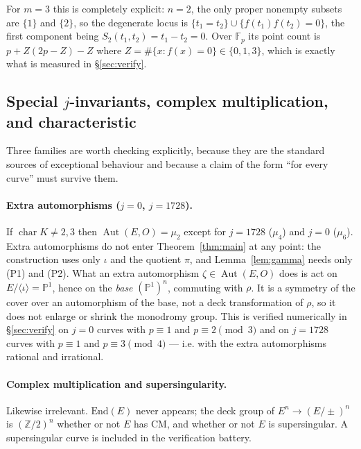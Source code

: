 \documentclass[11pt,a4paper]{article}
\theoremstyle{plain}
\theoremstyle{definition}
\DeclareMathOperator{\Aut}{Aut}
\newcommand{\PP}{\mathbb{P}}
\newcommand{\FF}{\mathbb{F}}
\newcommand{\ZZ}{\mathbb{Z}}
\begin{document}
For $m = 3$ this is completely explicit: $n = 2$, the only proper nonempty
subsets are $\{1\}$ and $\{2\}$, so the degenerate locus is
$\{t_1 = t_2\} \cup \{ f(t_1)f(t_2) = 0 \}$, the first component being
$S_2(t_1,t_2) = t_1 - t_2 = 0$. Over $\FF_p$ its point count is
$p + Z(2p - Z) - Z$ where $Z = \#\{ x : f(x) = 0\} \in \{0,1,3\}$, which is
exactly what is measured in \S\ref{sec:verify}.

\subsection{Special $j$-invariants, complex multiplication, and characteristic}
\label{sec:special}

Three families are worth checking explicitly, because they are the standard
sources of exceptional behaviour and because a claim of the form ``for every
curve'' must survive them.

\paragraph{Extra automorphisms ($j = 0$, $j = 1728$).}
If $\operatorname{char} K \neq 2,3$ then $\Aut(E,O) = \mu_2$ except for
$j = 1728$ ($\mu_4$) and $j = 0$ ($\mu_6$). Extra automorphisms do not enter
Theorem~\ref{thm:main} at any point: the construction uses only $\iota$ and the
quotient $\pi$, and Lemma~\ref{lem:gamma} needs only (P1) and (P2). What an extra
automorphism $\zeta \in \Aut(E,O)$ does is act on $E/\langle\iota\rangle = \PP^1$,
hence on the \emph{base} $(\PP^1)^n$, commuting with $\rho$. It is a symmetry of
the cover over an automorphism of the base, not a deck transformation of $\rho$,
so it does not enlarge or shrink the monodromy group. This is verified
numerically in \S\ref{sec:verify} on $j=0$ curves with $p \equiv 1$ and
$p \equiv 2 \pmod 3$ and on $j = 1728$ curves with $p \equiv 1$ and
$p \equiv 3 \pmod 4$ --- i.e. with the extra automorphisms rational and
irrational.

\paragraph{Complex multiplication and supersingularity.}
Likewise irrelevant. $\mathrm{End}(E)$ never appears; the deck group of
$E^n \to (E/{\pm})^n$ is $(\ZZ/2)^n$ whether or not $E$ has CM, and whether or
not $E$ is supersingular. A supersingular curve is included in the verification
battery.
\end{document}
